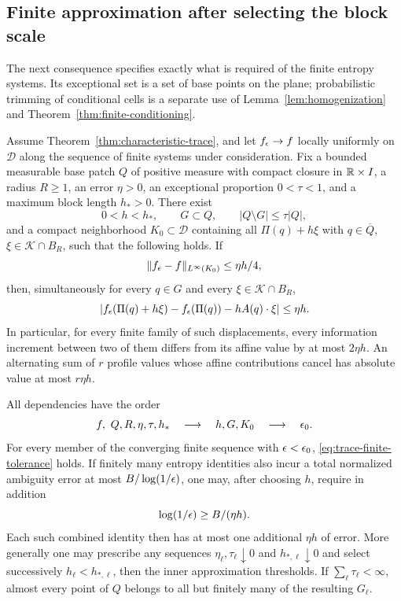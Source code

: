 \subsection{Finite approximation after selecting the block scale}

The next consequence specifies exactly what is required of the finite
entropy systems.  Its exceptional set is a set of base points on the
plane; probabilistic trimming of conditional cells is a separate use
of Lemma~\ref{lem:homogenization} and
Theorem~\ref{thm:finite-conditioning}.

\begin{corollary}
\label{cor:finite-characteristic-trace}
Assume Theorem~\ref{thm:characteristic-trace}, and let $f_\epsilon\to f$
locally uniformly on $\mathcal D$ along the sequence of finite systems
under consideration.  Fix a bounded measurable base patch $Q$ of
positive measure with compact closure in $\mathbb R\times I$, a radius
$R\ge1$, an error $\eta>0$, an exceptional proportion $0<\tau<1$,
and a maximum block length $h_*>0$.  There exist
\[
 0<h<h_*,\qquad G\subset Q,\qquad |Q\setminus G|\le\tau|Q|,
\]
and a compact neighborhood $K_0\subset\mathcal D$ containing all
$\Pi(q)+h\xi$ with $q\in\overline Q$, $\xi\in\mathcal K\cap B_R$,
such that the following holds.  If
\begin{equation}\label{eq:trace-finite-tolerance}
 \|f_\epsilon-f\|_{L^\infty(K_0)}\le\eta h/4,
\end{equation}
then, simultaneously for every $q\in G$ and every
$\xi\in\mathcal K\cap B_R$,
\begin{equation}\label{eq:trace-finite-affine}
 |f_\epsilon(\Pi(q)+h\xi)-f_\epsilon(\Pi(q))-hA(q)\cdot\xi|
 \le\eta h.
\end{equation}
In particular, for every finite family of such displacements, every
information increment between two of them differs from its affine
value by at most $2\eta h$.  An alternating sum of $r$ profile values
whose affine contributions cancel has absolute value at most
$r\eta h$.

All dependencies have the order
\[
 f,\ Q,R,\eta,\tau,h_*\quad\longrightarrow\quad h,G,K_0
 \quad\longrightarrow\quad\eps_0.
\]
For every member of the converging finite sequence with
$\epsilon<\epsilon_0$, \eqref{eq:trace-finite-tolerance} holds.  If finitely many
entropy identities also incur a total normalized ambiguity error at
most $B/\log(1/\epsilon)$, one may, after choosing $h$, require in addition
\[
 \log(1/\epsilon)\ge B/(\eta h).
\]
Each such combined identity then has at most one additional $\eta h$
of error.  More generally one may prescribe any sequences
$\eta_\ell,\tau_\ell\downarrow0$ and $h_{*,\ell}\downarrow0$ and
select successively $h_\ell<h_{*,\ell}$, then the inner approximation
thresholds.  If $\sum_\ell\tau_\ell<\infty$, almost every point of $Q$
belongs to all but finitely many of the resulting $G_\ell$.
\end{corollary}

